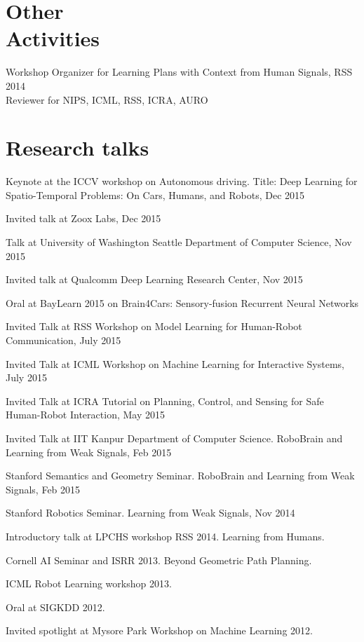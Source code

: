 \documentclass[line,margin]{res}
\begin{document}
\begin{resume}
\section{Other \\ Activities}
	Workshop Organizer for Learning Plans with Context from Human Signals, RSS 2014\\
	
	\vspace{-7mm}
	Reviewer for NIPS, ICML, RSS, ICRA, AURO \\

\section{Research talks}


Keynote at the ICCV workshop on Autonomous driving. Title: Deep Learning for Spatio-Temporal Problems: On Cars, Humans, and Robots, Dec 2015

Invited talk at Zoox Labs, Dec 2015

Talk at University of Washington Seattle Department of Computer Science, Nov 2015

Invited talk at Qualcomm Deep Learning Research Center, Nov 2015

Oral at BayLearn 2015 on Brain4Cars: Sensory-fusion Recurrent Neural Networks 

Invited Talk at RSS Workshop on Model Learning for Human-Robot Communication, July 2015

Invited Talk at ICML Workshop on Machine Learning for Interactive Systems, July 2015

Invited Talk at ICRA Tutorial on Planning, Control, and Sensing for Safe Human-Robot Interaction, May 2015

Invited Talk at IIT Kanpur Department of Computer Science. RoboBrain and Learning from Weak Signals, Feb 2015

Stanford Semantics and Geometry Seminar. RoboBrain and Learning from Weak Signals, Feb 2015

Stanford Robotics Seminar. Learning from Weak Signals, Nov 2014

Introductory talk at LPCHS workshop RSS 2014. Learning from Humans. 

Cornell AI Seminar and ISRR 2013. Beyond Geometric Path Planning. 

ICML Robot Learning workshop 2013.

Oral at SIGKDD 2012. 

Invited spotlight at Mysore Park Workshop on Machine Learning 2012. 


\end{resume}
\end{document}
